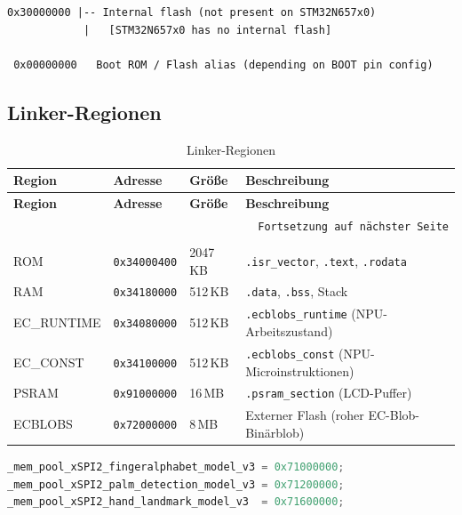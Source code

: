 \begin{lstlisting}[language={}, caption={CPU-Adressraum des Cortex-M55}, label={lst:cpu-adressraum}, numbers=none]
 0x30000000 |-- Internal flash (not present on STM32N657x0)
            |   [STM32N657x0 has no internal flash]

 0x00000000   Boot ROM / Flash alias (depending on BOOT pin config)
\end{lstlisting}

\subsection{Linker-Regionen}\label{sub:Linker-Regionen}

\begin{longtable}{|l|l|l|p{}|}
    \hline
    \textbf{Region} & \textbf{Adresse} & \textbf{Größe} & \textbf{Beschreibung} \\
    \hline
    \endfirsthead
    \hline
    \textbf{Region} & \textbf{Adresse} & \textbf{Größe} & \textbf{Beschreibung} \\
    \hline
    \endhead
    \hline
    \multicolumn{4}{r}{\texttt{Fortsetzung auf nächster Seite}} \\
    \endfoot
    \caption{Linker-Regionen}
    \label{tab:linker-regionen} \\
    \endlastfoot
    ROM         & \texttt{0x34000400} & 2047\,KB & \texttt{.isr\_vector}, \texttt{.text}, \texttt{.rodata} \\
    \hline
    RAM         & \texttt{0x34180000} & 512\,KB  & \texttt{.data}, \texttt{.bss}, Stack \\
    \hline
    EC\_RUNTIME & \texttt{0x34080000} & 512\,KB  & \texttt{.ecblobs\_runtime} (NPU-Arbeitszustand) \\
    \hline
    EC\_CONST   & \texttt{0x34100000} & 512\,KB  & \texttt{.ecblobs\_const} (NPU-Microinstruktionen) \\
    \hline
    PSRAM       & \texttt{0x91000000} & 16\,MB   & \texttt{.psram\_section} (LCD-Puffer) \\
    \hline
    ECBLOBS     & \texttt{0x72000000} & 8\,MB    & Externer Flash (roher EC-Blob-Binärblob) \\
    \hline
\end{longtable}

\newpage

\begin{lstlisting}[language=C, caption={Vom Linker exportierte Basissymbole}, label={lst:linker-symbole}]
_mem_pool_xSPI2_fingeralphabet_model_v3 = 0x71000000;
_mem_pool_xSPI2_palm_detection_model_v3 = 0x71200000;
_mem_pool_xSPI2_hand_landmark_model_v3  = 0x71600000;
\end{lstlisting}

